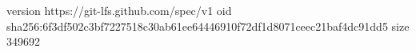 version https://git-lfs.github.com/spec/v1
oid sha256:6f3df502c3bf7227518c30ab61ee64446910f72df1d8071ceec21baf4dc91dd5
size 349692
